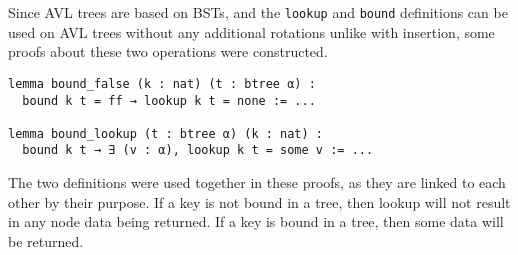 Since AVL trees are based on BSTs, and the \lstinline{lookup} and \lstinline{bound} definitions can be used on AVL trees without any additional rotations unlike with insertion, some proofs about these two operations were constructed.

\begin{lstlisting}
lemma bound_false (k : nat) (t : btree α) :
  bound k t = ff → lookup k t = none := ...

lemma bound_lookup (t : btree α) (k : nat) :
  bound k t → ∃ (v : α), lookup k t = some v := ...
\end{lstlisting}

The two definitions were used together in these proofs, as they are linked to each other by their purpose. If a key is not bound in a tree, then lookup will not result in any node data being returned. If a key is bound in a tree, then some data will be returned.